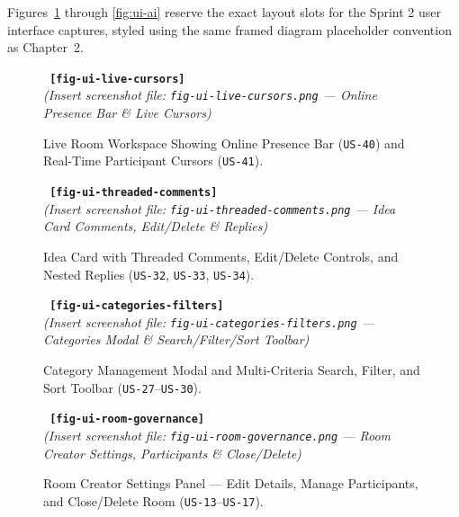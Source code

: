 Figures~\ref{fig:ui-cursors} through \ref{fig:ui-ai} reserve the exact layout slots for the Sprint 2 user interface captures, styled using the same framed diagram placeholder convention as Chapter~2.

\begin{figure}[htbp]
    \centering
    \begin{screenshotplaceholder}
        \texttt{\bfseries\color{mindNavy} [fig-ui-live-cursors]}\\[4pt]
        \small\textit{\color{mindSlate}(Insert screenshot file: \texttt{fig-ui-live-cursors.png} — Online Presence Bar \& Live Cursors)}
    \end{screenshotplaceholder}
    \caption{Live Room Workspace Showing Online Presence Bar (\texttt{US-40}) and Real-Time Participant Cursors (\texttt{US-41}).}
    \label{fig:ui-cursors}
\end{figure}

\begin{figure}[htbp]
    \centering
    \begin{screenshotplaceholder}
        \texttt{\bfseries\color{mindNavy} [fig-ui-threaded-comments]}\\[4pt]
        \small\textit{\color{mindSlate}(Insert screenshot file: \texttt{fig-ui-threaded-comments.png} — Idea Card Comments, Edit/Delete \& Replies)}
    \end{screenshotplaceholder}
    \caption{Idea Card with Threaded Comments, Edit/Delete Controls, and Nested Replies (\texttt{US-32}, \texttt{US-33}, \texttt{US-34}).}
    \label{fig:ui-comments}
\end{figure}

\begin{figure}[htbp]
    \centering
    \begin{screenshotplaceholder}
        \texttt{\bfseries\color{mindNavy} [fig-ui-categories-filters]}\\[4pt]
        \small\textit{\color{mindSlate}(Insert screenshot file: \texttt{fig-ui-categories-filters.png} — Categories Modal \& Search/Filter/Sort Toolbar)}
    \end{screenshotplaceholder}
    \caption{Category Management Modal and Multi-Criteria Search, Filter, and Sort Toolbar (\texttt{US-27}--\texttt{US-30}).}
    \label{fig:ui-categories}
\end{figure}

\begin{figure}[htbp]
    \centering
    \begin{screenshotplaceholder}
        \texttt{\bfseries\color{mindNavy} [fig-ui-room-governance]}\\[4pt]
        \small\textit{\color{mindSlate}(Insert screenshot file: \texttt{fig-ui-room-governance.png} — Room Creator Settings, Participants \& Close/Delete)}
    \end{screenshotplaceholder}
    \caption{Room Creator Settings Panel — Edit Details, Manage Participants, and Close/Delete Room (\texttt{US-13}--\texttt{US-17}).}
    \label{fig:ui-room-settings}
\end{figure}

